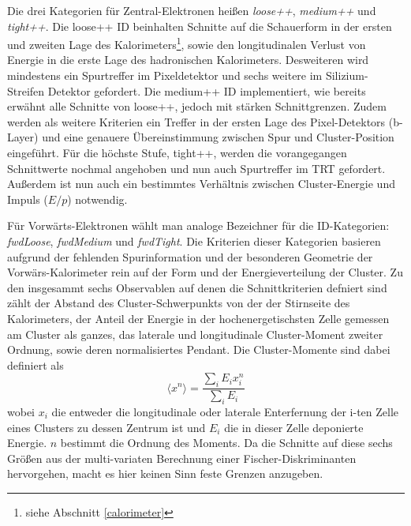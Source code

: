 Die drei Kategorien für Zentral-Elektronen heißen \textit{loose++},
\textit{medium++} und \textit{tight++}. Die loose++ ID beinhalten Schnitte auf
die Schauerform in der ersten und zweiten Lage des Kalorimeters\footnote{siehe
Abschnitt \ref{calorimeter}}, sowie den longitudinalen Verlust von Energie in
die erste Lage des hadronischen Kalorimeters. Desweiteren wird mindestens ein
Spurtreffer im Pixeldetektor und sechs weitere im Silizium-Streifen Detektor
gefordert. Die medium++ ID implementiert, wie bereits erwähnt alle Schnitte von
loose++, jedoch mit stärken Schnittgrenzen. Zudem werden als weitere Kriterien
ein Treffer in der ersten Lage des Pixel-Detektors (b-Layer) und eine genauere
Übereinstimmung zwischen Spur und Cluster-Position eingeführt. Für die höchste
Stufe, tight++, werden die vorangegangen Schnittwerte nochmal angehoben und nun
auch Spurtreffer im \ac{TRT} gefordert. Außerdem ist nun auch ein bestimmtes
Verhältnis zwischen Cluster-Energie und Impuls ($E/p$) notwendig.

Für Vorwärts-Elektronen wählt man analoge Bezeichner für die ID-Kategorien:
\linebreak
\textit{fwdLoose}, \textit{fwdMedium} und \textit{fwdTight}. Die Kriterien
dieser Kategorien basieren aufgrund der fehlenden Spurinformation und der
besonderen Geometrie der Vorwärs-Kalorimeter rein auf der Form und der
Energieverteilung der Cluster. Zu den insgesammt sechs Observablen auf denen
die Schnittkriterien defniert sind zählt der Abstand des Cluster-Schwerpunkts
von der der Stirnseite des Kalorimeters, der Anteil der Energie in der
hochenergetischsten Zelle gemessen am Cluster als ganzes, das laterale und
longitudinale Cluster-Moment zweiter Ordnung, sowie deren normalisiertes
Pendant. Die Cluster-Momente sind dabei definiert als
\begin{equation}
    \langle x^n \rangle = \frac{\sum_i E_i x_i^n}{\sum_i E_i}
\end{equation}
wobei $x_i$ die entweder die longitudinale oder laterale Enterfernung der i-ten
Zelle eines Clusters zu dessen Zentrum ist und $E_i$ die in dieser Zelle
deponierte Energie. $n$ bestimmt die Ordnung des Moments. Da die Schnitte auf
diese sechs Größen aus der multi-variaten Berechnung einer
Fischer-Diskriminanten hervorgehen, macht es hier keinen Sinn feste Grenzen
anzugeben.
